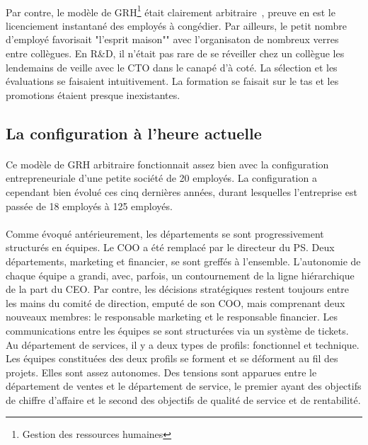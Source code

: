 \paragraph{}Par contre, le modèle de GRH\footnote{Gestion des ressources humaines} était clairement arbitraire~\citep[pp. 115-119]{pichault}, preuve en est le licenciement instantané des employés à congédier. Par ailleurs, le petit nombre d'employé favorisait "l'esprit maison"" avec l'organisaton de nombreux verres entre collègues. En R\&D, il n'était pas rare de se réveiller chez un collègue les lendemains de veille avec le CTO dans le canapé d'à coté. La sélection et les évaluations se faisaient intuitivement.  La formation se faisait sur le tas et les promotions étaient presque inexistantes. 

\subsection{La configuration à l'heure actuelle}
\paragraph{} Ce modèle de GRH arbitraire fonctionnait assez bien avec la configuration entrepreneuriale d'une petite société de 20 employés. La configuration a cependant bien évolué ces cinq dernières années, durant lesquelles l'entreprise est passée de 18 employés à 125 employés. 

\paragraph{} Comme évoqué antérieurement, les départements se sont progressivement structurés en équipes. Le COO a été remplacé par le directeur du PS. Deux départements, marketing et financier, se sont greffés à l'ensemble. L'autonomie de chaque équipe a grandi, avec, parfois, un contournement de la ligne hiérarchique de la part du CEO. Par contre, les décisions stratégiques restent toujours entre les mains du comité de direction, emputé de son COO, mais comprenant deux nouveaux membres: le responsable marketing et le responsable financier. Les communications entre les équipes se sont structurées via un système de tickets. Au département de services, il y a deux types de profils: fonctionnel et technique. Les équipes constituées des deux profils se forment et se déforment au fil des projets. Elles sont assez autonomes. Des tensions sont apparues entre le département de ventes et le département de service, le premier ayant des objectifs de chiffre d'affaire et le second des objectifs de qualité de service et de rentabilité.

